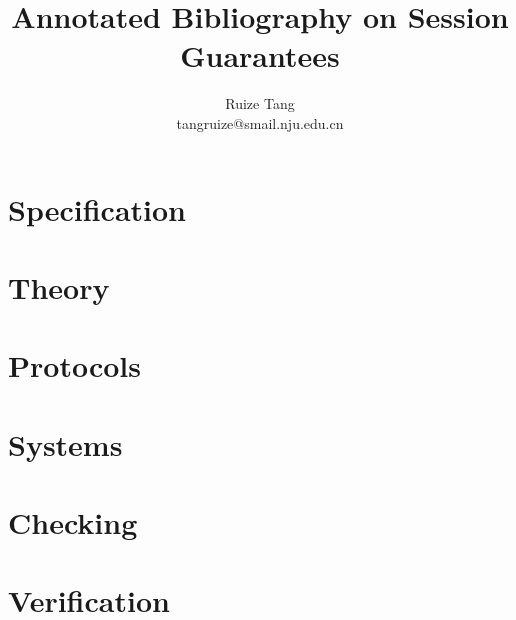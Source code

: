 \documentclass[12pt,letterpaper]{article}
\begin{document}
\title{Annotated Bibliography on Session Guarantees}
\author{Ruize Tang \\ tangruize@smail.nju.edu.cn}

\maketitle
\thispagestyle{fancy}
\section{Specification} \label{section:spec}



\section{Theory} \label{section:theory}


\section{Protocols} \label{section:protocols}

\section{Systems} \label{section:systems}

\section{Checking} \label{section:checking}

\section{Verification} \label{section:verification}

 
\end{document}
